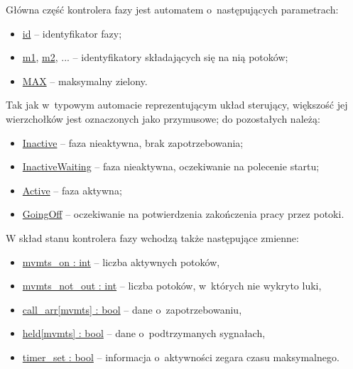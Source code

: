 \documentclass{pracamgr}
\theoremstyle{plain}
\begin{document}
Główna część kontrolera fazy jest automatem o~następujących
parametrach:
\begin{itemize}
  \item \url{id} -- identyfikator fazy;
  \item \url{m1}, \url{m2}, ... -- identyfikatory składających się na
  nią potoków;
  \item \url{MAX} -- maksymalny zielony.
\end{itemize}
Tak jak w~typowym automacie reprezentującym układ sterujący, większość jej
wierzchołków jest oznaczonych jako przymusowe; do pozostałych należą:
\begin{itemize}
  \item \url{Inactive} -- faza nieaktywna, brak zapotrzebowania;
  \item \url{InactiveWaiting} -- faza nieaktywna, oczekiwanie na
  polecenie startu;
  \item \url{Active} -- faza aktywna;
  \item \url{GoingOff} -- oczekiwanie na potwierdzenia zakończenia
  pracy przez potoki.
\end{itemize}
W skład stanu kontrolera fazy wchodzą także następujące zmienne:
\begin{itemize}
  \item \url{mvmts_on : int} -- liczba aktywnych potoków,
  \item \url{mvmts_not_out : int} -- liczba potoków, w~których nie wykryto luki,
  \item \url{call_arr[mvmts] : bool} -- dane o~zapotrzebowaniu,
  \item \url{held[mvmts] : bool} -- dane o~podtrzymanych sygnałach,
  \item \url{timer_set : bool} -- informacja o~aktywności zegara czasu
  maksymalnego.
\end{itemize}
\end{document}
